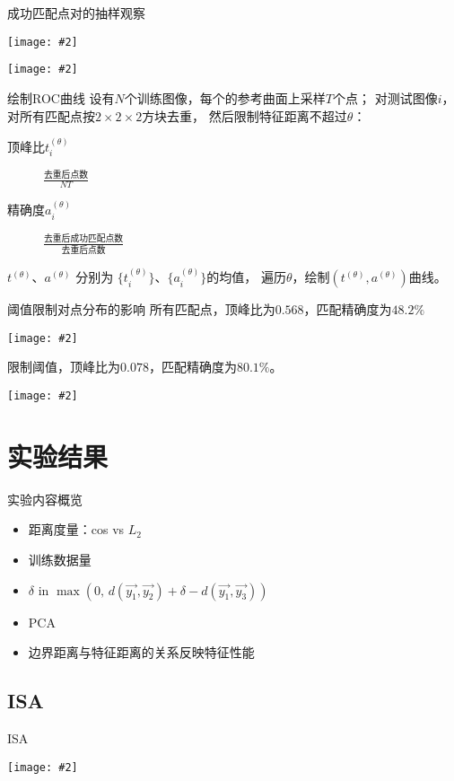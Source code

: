 \documentclass {beamer}
\newcommand{\addgraph}[2]{\begin{center}
\texttt{[image: \#2]}\end{center}}
\begin{document}
\begin{frame}{成功匹配点对的抽样观察}
    \addgraph{0.8}{res/expr-match/pt-patch.png}

    \addgraph{0.8}{res/expr-match/pt-bd-dist.png}
\end{frame}

\begin{frame}{绘制ROC曲线}
    设有$N$个训练图像，每个的参考曲面上采样$T$个点；
    对测试图像$i$，对所有匹配点按$2\times 2\times 2$方块去重，
    然后限制特征距离不超过$\theta$：
    \begin{description}
        \item[顶峰比$t_i^{(\theta)}$]
            $\frac{\text{去重后点数}}{NT}$
        \item[精确度$a_i^{(\theta)}$]
            $\frac{\text{去重后成功匹配点数}}{\text{去重后点数}}$
    \end{description}
    $t^{(\theta)}$、$a^{(\theta)}$
    分别为
    $\{t_i^{(\theta)}\}$、$\{a_i^{(\theta)}\}$的均值，
    遍历$\theta$，绘制$(t^{(\theta)}, a^{(\theta)})$曲线。
\end{frame}

\begin{frame}{阈值限制对点分布的影响}
    所有匹配点，顶峰比为$0.568$，匹配精确度为$48.2\%$
    \addgraph{0.7}{res/expr-match/48.2-half.png}

    限制阈值，顶峰比为$0.078$，匹配精确度为$80.1\%$。
    \addgraph{0.7}{res/expr-match/80.1-half.png}
\end{frame}

\section{实验结果}

\begin{frame}{实验内容概览}
    \begin{itemize}
        \item 距离度量：cos vs $L_2$
        \item 训练数据量
        \item $\delta$ in $\max\left(0,\,
            d(\vec{y_1}, \vec{y_2}) + \delta - d(\vec{y_1}, \vec{y_3})\right)$
        \item PCA
        \item 边界距离与特征距离的关系反映特征性能
    \end{itemize}
\end{frame}

\subsection{ISA}
\begin{frame}{ISA}
    \addgraph{0.65}{res/expr/isa.pdf}
\end{frame}
\end{document}
